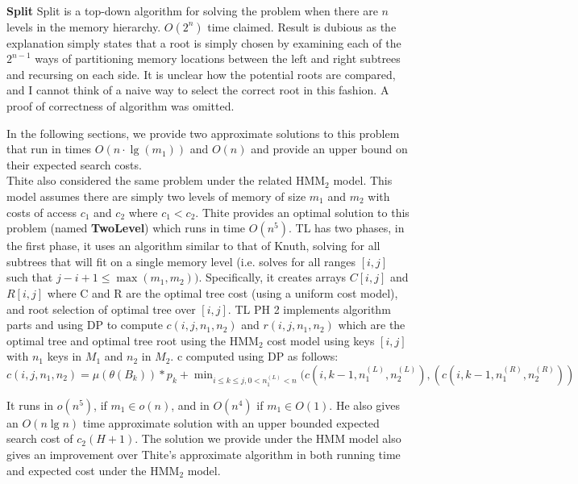 \documentclass[]{beamer}
\theoremstyle{plain}
\begin{document}
\begin{frame}
\textbf{Split}
Split is a top-down algorithm for solving the problem when there are $n$ levels in the memory hierarchy. $O(2^n)$ time claimed. Result is dubious as the explanation simply states that a root is simply chosen by examining each of the $2^{n-1}$ ways of partitioning memory locations between the left and right subtrees and recursing on each side. It is unclear how the potential roots are compared, and I cannot think of a naive way to select the correct root in this fashion. A proof of correctness of algorithm was omitted.

 In the following sections, we provide two approximate solutions to this problem that run in times $O(n \cdot \lg(m_1))$ and $O(n)$ and provide an upper bound on their expected search costs.  \\

Thite also considered the same problem under the related HMM$_2$ model. This model assumes there are simply two levels of memory of size $m_1$ and $m_2$ with costs of access $c_1$ and $c_2$ where $c_1 < c_2$. Thite provides an optimal solution to this problem (named \textbf{TwoLevel}) which runs in time $O(n^5)$.
TL has two phases, in the first phase, it uses an algorithm similar to that of Knuth, solving for all subtrees that will fit on a single memory level (i.e. solves for all ranges $[i,j]$ such that $j-i+1 \leq \max(m_1, m_2))$. Specifically, it creates arrays $C[i,j]$ and $R[i,j]$ where C and R are the optimal tree cost (using a uniform cost model), and root selection of optimal tree over $[i,j]$.
TL PH 2 implements algorithm parts and using DP to compute $c(i,j,n_1,n_2)$ and $r(i,j,n_1, n_2)$ which are the optimal tree and optimal tree root using the HMM$_2$ cost model using keys $[i,j]$ with $n_1$ keys in $M_1$ and $n_2$ in $M_2$. c computed using DP as follows:
$c(i,j,n_1,n_2) = \mu ( \theta ( B_k))* p_k + \min_{i \leq k \leq j, 0 < n_1^{(L)} < n} (c(i, k-1, n_1^{(L)}, n_2^{(L)}), (c(i, k-1, n_1^{(R)}, n_2^{(R)}))$


It runs in $o(n^5)$, if $m_1 \in o(n)$, and in $O(n^4)$ if $m_1 \in O(1)$. He also gives an $O(n\lg n)$ time approximate solution with an upper bounded expected search cost of $c_2(H+1)$. The solution we provide under the HMM model also gives an improvement over Thite's approximate algorithm in both running time and expected cost under the HMM$_2$ model.
\end{frame}
\end{document}
